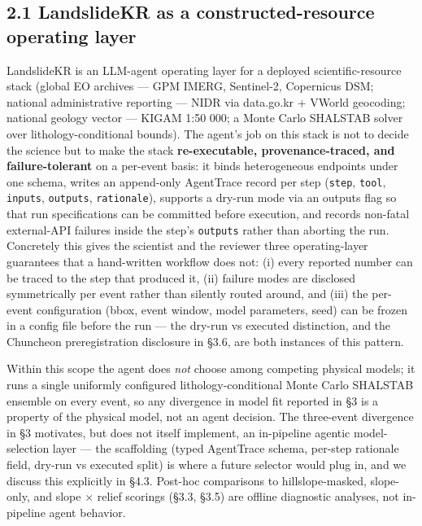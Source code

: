 \documentclass[11pt,a4paper]{article}
\begin{document}
\subsection{2.1 LandslideKR as a constructed-resource operating layer}\label{landslidekr-as-a-constructed-resource-operating-layer}

LandslideKR is an LLM-agent operating layer for a deployed scientific-resource stack (global EO archives --- GPM IMERG, Sentinel-2, Copernicus DSM; national administrative reporting --- NIDR via data.go.kr + VWorld geocoding; national geology vector --- KIGAM 1:50 000; a Monte Carlo SHALSTAB solver over lithology-conditional bounds). The agent's job on this stack is not to decide the science but to make the stack \textbf{re-executable, provenance-traced, and failure-tolerant} on a per-event basis: it binds heterogeneous endpoints under one schema, writes an append-only AgentTrace record per step (\texttt{step}, \texttt{tool}, \texttt{inputs}, \texttt{outputs}, \texttt{rationale}), supports a dry-run mode via an outputs flag so that run specifications can be committed before execution, and records non-fatal external-API failures inside the step's \texttt{outputs} rather than aborting the run. Concretely this gives the scientist and the reviewer three operating-layer guarantees that a hand-written workflow does not: (i) every reported number can be traced to the step that produced it, (ii) failure modes are disclosed symmetrically per event rather than silently routed around, and (iii) the per-event configuration (bbox, event window, model parameters, seed) can be frozen in a config file before the run --- the dry-run vs executed distinction, and the Chuncheon preregistration disclosure in §3.6, are both instances of this pattern.

Within this scope the agent does \emph{not} choose among competing physical models; it runs a single uniformly configured lithology-conditional Monte Carlo SHALSTAB ensemble on every event, so any divergence in model fit reported in §3 is a property of the physical model, not an agent decision. The three-event divergence in §3 motivates, but does not itself implement, an in-pipeline agentic model-selection layer --- the scaffolding (typed AgentTrace schema, per-step rationale field, dry-run vs executed split) is where a future selector would plug in, and we discuss this explicitly in §4.3. Post-hoc comparisons to hillslope-masked, slope-only, and slope × relief scorings (§3.3, §3.5) are offline diagnostic analyses, not in-pipeline agent behavior.
\end{document}
